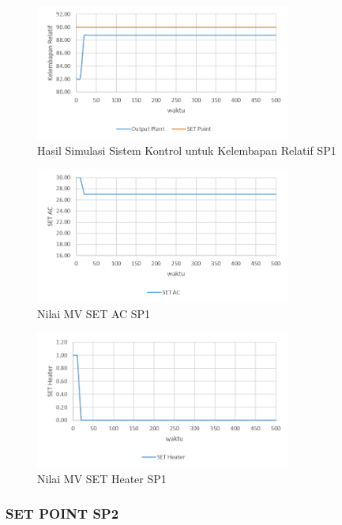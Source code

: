 \begin{figure}[!h]
	\centering
	\includegraphics[width=0.75\textwidth]{figures/SimulinkSP1RH}
	\caption{Hasil Simulasi Sistem Kontrol untuk Kelembapan Relatif SP1}
	\label{fig:5:SimulinkSP1RH}
\end{figure}

\begin{figure}[!h]
	\centering
	\includegraphics[width=0.75\textwidth]{figures/SimulinkSP1AC}
	\caption{Nilai MV SET AC SP1}
	\label{fig:5:SimulinkSP1AC}
\end{figure}

\begin{figure}[!h]
	\centering
	\includegraphics[width=0.75\textwidth]{figures/SimulinkSP1HT}
	\caption{Nilai MV SET Heater SP1}
	\label{fig:5:SimulinkSP1HT}
\end{figure}

\subsubsection{SET POINT SP2}

